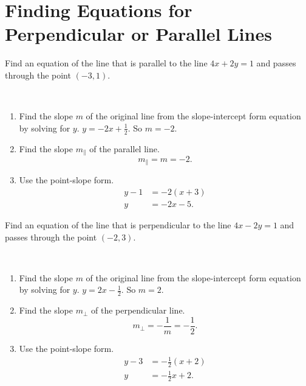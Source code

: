 \documentclass[
  en,11pt]{elegantbook}
\newcommand{\parll}{ {\mathbin{\parallel}} }
\let\BeginKnitrBlock\begin \let\EndKnitrBlock\end
\begin{document}
\hypertarget{finding-equations-for-perpendicular-or-parallel-lines}{%
\section{Finding Equations for Perpendicular or Parallel Lines}\label{finding-equations-for-perpendicular-or-parallel-lines}}

\BeginKnitrBlock{example}
\protect\hypertarget{exm:unnamed-chunk-238}{}{\label{exm:unnamed-chunk-238} }
Find an equation of the line that is parallel to the line \(4x+2y=1\) and passes through the point \((-3, 1)\).
\EndKnitrBlock{example}

\BeginKnitrBlock{solution}
{}\\

\begin{enumerate}
\def\labelenumi{\arabic{enumi}.}

\item
  Find the slope \(m\) of the original line from the slope-intercept form equation by solving for \(y\). \(y=-2x+\frac12\). So \(m=-2\).
\item
  Find the slope \(m_\parll\) of the parallel line.
  \[m_\parll=m=-2.\]
\item
  Use the point-slope form.
  \[
       \begin{aligned}
           y-1&=-2(x+3)\\
           y&=-2x-5.
       \end{aligned}
   \]
\end{enumerate}
\EndKnitrBlock{solution}

\BeginKnitrBlock{example}
\protect\hypertarget{exm:unnamed-chunk-240}{}{\label{exm:unnamed-chunk-240} }
Find an equation of the line that is perpendicular to the line \(4x-2y=1\) and passes through the point \((-2,3)\).
\EndKnitrBlock{example}

\BeginKnitrBlock{solution}
{}\\

\begin{enumerate}
\def\labelenumi{\arabic{enumi}.}

\item
  Find the slope \(m\) of the original line from the slope-intercept form equation by solving for \(y\). \(y=2x-\frac12\). So \(m=2\).
\item
  Find the slope \(m_\perp\) of the perpendicular line.
  \[m_\perp=-\frac1m=-\frac12.\]
\item
  Use the point-slope form.
  \[
       \begin{aligned}
           y-3&=-\frac12(x+2)\\
           y&=-\frac{1}{2}x+2.
       \end{aligned}
   \]
\end{enumerate}
\EndKnitrBlock{solution}
\end{document}
